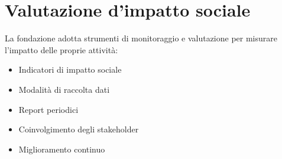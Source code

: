 
\section*{Valutazione d’impatto sociale}

La fondazione adotta strumenti di monitoraggio e valutazione per misurare l’impatto delle proprie attività:

\begin{itemize}
  \item Indicatori di impatto sociale
  \item Modalità di raccolta dati
  \item Report periodici
  \item Coinvolgimento degli stakeholder
  \item Miglioramento continuo
\end{itemize}

